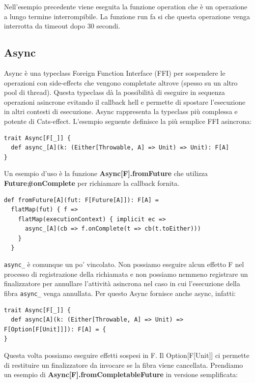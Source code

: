 \noindent Nell’esempio precedente viene eseguita la funzione operation che è un operazione a lungo termine interrompibile. La funzione run fa si che questa operazione venga  interrotta da timeout dopo 30 secondi.

\subsection{Async}
Async è una typeclass Foreign Function Interface (FFI) per sospendere le operazioni con side-effects che vengono completate altrove (spesso su un altro pool di thread). Questa typeclass dà la possibilità di eseguire in sequenza operazioni asincrone evitando il callback hell e permette
di spostare l’esecuzione in altri contesti di esecuzione. Async rappresenta la typeclass più complessa e potente di Cats-effect. L'esempio seguente definisce la più semplice FFI asincrona:

\begin{verbatim}
trait Async[F[_]] {
  def async_[A](k: (Either[Throwable, A] => Unit) => Unit): F[A]
}
\end{verbatim}

Un esempio d'uso è la funzione \textbf{Async[F].fromFuture} che utilizza \textbf{Future\#onComplete} per richiamare la callback fornita.

\begin{verbatim}
def fromFuture[A](fut: F[Future[A]]): F[A] =
  flatMap(fut) { f =>
    flatMap(executionContext) { implicit ec =>
      async_[A](cb => f.onComplete(t => cb(t.toEither)))
    }
  }
\end{verbatim}

\noindent \texttt{async\_} è comunque un po' vincolato. Non possiamo eseguire alcun effetto F nel processo di registrazione della richiamata e non possiamo nemmeno registrare un finalizzatore per annullare l'attività asincrona nel caso in cui l'esecuzione della fibra \texttt{async\_} venga annullata. Per questo Async fornisce anche async, infatti:

\begin{verbatim}
trait Async[F[_]] {
  def async[A](k: (Either[Throwable, A] => Unit) => F[Option[F[Unit]]]): F[A] = {
}
\end{verbatim}

\noindent Questa volta possiamo eseguire effetti sospesi in F. Il Option[F[Unit]] ci permette di restituire un finalizzatore da invocare se la fibra viene cancellata. Prendiamo un esempio di \textbf{Async[F].fromCompletableFuture} in versione semplificata:

